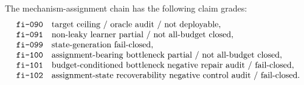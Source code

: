 The mechanism-assignment chain has the following claim grades:
$$
\begin{array}{@{}ll@{}}
\texttt{fi-090} & \text{target ceiling / oracle audit / not deployable},\\
\texttt{fi-091} & \text{non-leaky learner partial / not all-budget closed},\\
\texttt{fi-099} & \text{state-generation fail-closed},\\
\texttt{fi-100} & \text{assignment-bearing bottleneck partial / not all-budget closed},\\
\texttt{fi-101} & \text{budget-conditioned bottleneck negative repair audit / fail-closed},\\
\texttt{fi-102} & \text{assignment-state recoverability negative control audit / fail-closed}.
\end{array}
$$
